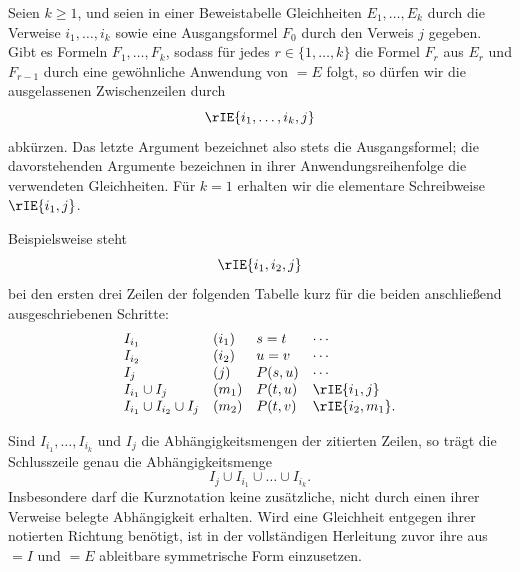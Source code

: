 \documentclass[main.tex]{subfiles}
\begin{document}
\begin{definition}
\label{def:iterated-equality-elimination-meta}
Seien \(k\geq 1\), und seien in einer Beweistabelle Gleichheiten
\(E_1,\ldots,E_k\) durch die Verweise
\(i_1,\ldots,i_k\) sowie eine Ausgangsformel \(F_0\) durch den
Verweis \(j\) gegeben. Gibt es Formeln \(F_1,\ldots,F_k\), sodass
für jedes \(r\in\{1,\ldots,k\}\) die Formel \(F_r\) aus \(E_r\) und
\(F_{r-1}\) durch eine gewöhnliche Anwendung von \(=E\) folgt, so
dürfen wir die ausgelassenen Zwischenzeilen durch
\[
  \rIE{i_1,\ldots,i_k,j}
\]
abkürzen. Das letzte Argument bezeichnet also stets die
Ausgangsformel; die davorstehenden Argumente bezeichnen in ihrer
Anwendungsreihenfolge die verwendeten Gleichheiten. Für \(k=1\)
erhalten wir die elementare Schreibweise \(\rIE{i_1,j}\).

Beispielsweise steht
\[
  \rIE{i_1,i_2,j}
\]
bei den ersten drei Zeilen der folgenden Tabelle kurz für die beiden
anschließend ausgeschriebenen Schritte:
\[
  \begin{array}{llll}
    I_{i_1} & (i_1) & s=t     & \cdots \\
    I_{i_2} & (i_2) & u=v     & \cdots \\
    I_j     & (j)   & P(s,u)  & \cdots \\
    I_{i_1}\cup I_j
            & (m_1) & P(t,u)  & \rIE{i_1,j} \\
    I_{i_1}\cup I_{i_2}\cup I_j
            & (m_2) & P(t,v)  & \rIE{i_2,m_1}.
  \end{array}
\]

Sind \(I_{i_1},\ldots,I_{i_k}\) und \(I_j\) die
Abhängigkeitsmengen der zitierten Zeilen, so trägt die Schlusszeile
genau die Abhängigkeitsmenge
\[
  I_j\cup I_{i_1}\cup\dots\cup I_{i_k}.
\]
Insbesondere darf die Kurznotation keine zusätzliche, nicht durch
einen ihrer Verweise belegte Abhängigkeit erhalten. Wird eine
Gleichheit entgegen ihrer notierten Richtung benötigt, ist in der
vollständigen Herleitung zuvor ihre aus \(=I\) und \(=E\) ableitbare
symmetrische Form einzusetzen.
\end{definition}
\end{document}
